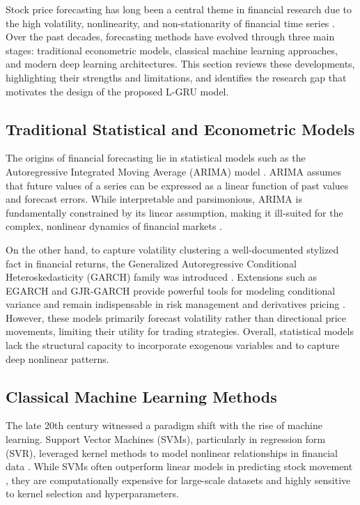 \documentclass{cys}
\begin{document}
Stock price forecasting has long been a central theme in financial research due to the high volatility, nonlinearity, and non-stationarity of financial time series \cite{refenes1994stock}. Over the past decades, forecasting methods have evolved through three main stages: traditional econometric models, classical machine learning approaches, and modern deep learning architectures. This section reviews these developments, highlighting their strengths and limitations, and identifies the research gap that motivates the design of the proposed L-GRU model.

\subsection{Traditional Statistical and Econometric Models}
The origins of financial forecasting lie in statistical models such as the Autoregressive Integrated Moving Average (ARIMA) model \cite{box2015time}. ARIMA assumes that future values of a series can be expressed as a linear function of past values and forecast errors. While interpretable and parsimonious, ARIMA is fundamentally constrained by its linear assumption, making it ill-suited for the complex, nonlinear dynamics of financial markets \cite{makridakis2000m3}.

On the other hand, to capture volatility clustering a well-documented stylized fact in financial returns, the Generalized Autoregressive Conditional Heteroskedasticity (GARCH) family was introduced \cite{bollerslev1986generalized, rachev2011financial}. Extensions such as EGARCH and GJR-GARCH provide powerful tools for modeling conditional variance and remain indispensable in risk management and derivatives pricing \cite{engle1982autoregressive}. However, these models primarily forecast volatility rather than directional price movements, limiting their utility for trading strategies. Overall, statistical models lack the structural capacity to incorporate exogenous variables and to capture deep nonlinear patterns.

\subsection{Classical Machine Learning Methods}
The late 20th century witnessed a paradigm shift with the rise of machine learning. Support Vector Machines (SVMs), particularly in regression form (SVR), leveraged kernel methods to model nonlinear relationships in financial data \cite{cortes1995support}. While SVMs often outperform linear models in predicting stock movement \cite{huang2005forecasting}, they are computationally expensive for large-scale datasets and highly sensitive to kernel selection and hyperparameters.
\end{document}
